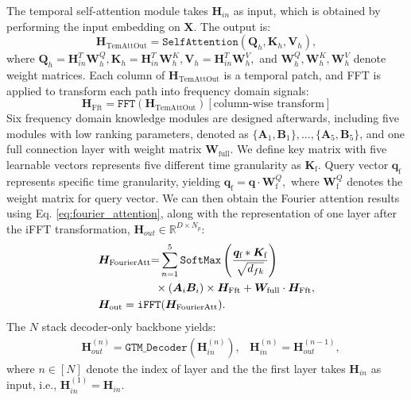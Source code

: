 The temporal self-attention module takes $\bm{H}_{in}$ as input, which is obtained by performing the input embedding on $\bm{X}$.
The output is:
\begin{equation} 
\label{eq:temporal_attention}
    \bm{H}_{\text{TemAttOut}} = \texttt{SelfAttention}(\bm{Q}_h, \bm{K}_h, \bm{V}_h), 
\end{equation}
where  
$ 
\bm{Q}_h {=} \bm{H}_{in}^T \bm{W}_h^Q,  
\bm{K}_h {=} \bm{H}_{in}^T  \bm{W}_h^K,  
\bm{V}_h {=} \bm{H}_{in}^T  \bm{W}_h^V,  
$
and $\bm{W}_h^Q, \bm{W}_h^K,\bm{W}_h^V$ 
denote weight matrices.  
Each column of $\bm{H}_{\text{TemAttOut}}$ is a temporal patch, 
and FFT is applied to transform 
each path into frequency domain signals:  
\begin{equation} 
\label{eq:fft}
    \bm{H}_{\text{Fft}} = \texttt{FFT} (\bm{H}_{\text{TemAttOut}})  
    [\text{column-wise transform}]
\end{equation}
Six frequency domain knowledge modules are designed afterwards, 
including five modules with low ranking parameters, 
denoted as $\{\bm{A}_{1}, \bm{B}_{1}\}, \ldots, 
\{\bm{A}_{5}, \bm{B}_{5}\}$,   
and one full connection layer with weight matrix 
$\bm{W}_{\text{full}}$. 
We define key matrix with five learnable vectors represents five different time granularity as $\bm{K}_{\text{f}}$.  
Query vector $\bm{q}_{\text{f}}$ represents specific time granularity, 
yielding 
$ 
\bm{q}_{\text{f}}=\bm{q} \cdot \bm{W}_{\text{f}}^Q, 
$
where $\bm{W}_{\text{f}}^Q$ denotes the weight matrix for query vector.
We can then obtain the Fourier attention results using Eq. \ref{eq:fourier_attention}, along with the representation of one layer after the iFFT transformation, $\bm{H}_{out}\in\mathbb{R}^{D\times N_p}$:
\begin{align}  
& 
\bm{H}_{\text{FourierAtt}} 
{=}  \sum_{n=1}^{5}
    \texttt{SoftMax} 
    \left(
    \frac{\bm{q}_{\text{f}}*\bm{K}_{\text{f}}}{\sqrt{d_{fk}}}
    \right)
    \nonumber
    \\
 &   \hspace{0.7in} 
  \times 
    (
    \bm{A}_{i}\bm{B}_{i}
    ) 
\times \bm{H}_{\text{Fft}}  
+ \bm{W}_{\text{full}}\cdot \bm{H}_{\text{Fft}},
 \label{eq:fourier_attention}
\\ 
&    \bm{H}_{\text{out}} = \texttt{iFFT}(\bm{H}_{\text{FourierAtt}}).
    \label{eq:ifft}
\end{align}
The $N$ stack decoder-only backbone yields:
\begin{align} 
& 
\bm{H}_{out}^{(n)} 
= 
\texttt{GTM\_Decoder}(\bm{H}_{in}^{(n)}),
&
\bm{H}_{in}^{(n)} = \bm{H}_{out}^{(n-1)},   
\label{eq:block}
\end{align}
where $n \in [N]$ denote the index of layer and 
the the first layer takes $\bm{H}_{in}$ as input, 
i.e., $\bm{H}_{in}^{(1)} = \bm{H}_{in}$.   

